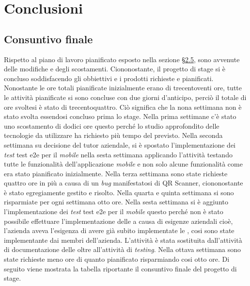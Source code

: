 
\chapter{Conclusioni}
\label{cap:conclusioni}

\section{Consuntivo finale}
Rispetto al piano di lavoro pianificato esposto nella sezione \hyperref[cap:pianificazione]{§2.5}, sono avvenute delle modifiche e degli scostamenti. Ciononostante, il progetto di stage si è concluso soddisfacendo gli obbiettivi e i prodotti richieste e pianificati. Nonostante le ore totali pianificate inizialmente erano di trecentoventi ore, tutte le attività pianificate si sono concluse con due giorni d'anticipo, perciò il totale di ore svoltesi è stato di trecentoquattro. Ciò significa che la nona settimana non è stato svolta essendosi concluso prima lo stage. Nella prima settimane c'è stato uno scostamento di dodici ore questo perché lo studio approfondito delle tecnologie da utilizzare ha richiesto più tempo del previsto. Nella seconda settimana su decisione del tutor aziendale, si è spostato l'implementazione dei \emph{test} \gls{test e2e} per il \emph{mobile} nella sesta settimana applicando l'attività testando tutte le funzionalità dell'applicazione \emph{mobile} e non solo alcune funzionalità come era stato pianificato inizialmente. Nella terza settimana sono state richieste quattro ore in più a causa di un \emph{bug} manifestatosi di QR Scanner, ciononostante è stato egregiamente gestito e risolto. Nella quarta e quinta settimana si sono risparmiate per ogni settimana otto ore. Nella sesta settimana si è aggiunto l'implementazione dei \emph{test} \gls{test e2e} per il \emph{mobile} questo perché non è stato possibile effettuare l'implementazione delle \textcolor{SchoolColor}{\ap{[g]}} a causa di esigenze aziendali cioè, l'azienda aveva l'esigenza di avere già subito implementate le \textcolor{SchoolColor}{\ap{[g]}}, cosi sono state implementante dai membri dell'azienda. L'attività è stata sostituita dall'attività di documentazione delle \textcolor{SchoolColor}{\ap{[g]}} oltre all'attività di \emph{testing}.
Nella ottava settimana sono state richieste meno ore di quanto pianificato risparmiando cosi otto ore.
Di seguito viene mostrata la tabella riportante il consuntivo finale del progetto di stage.

